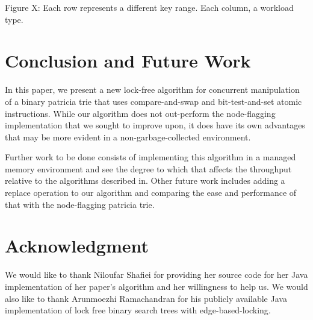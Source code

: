 \documentclass[conference]{IEEEtran}
\begin{document}
Figure X: Each row represents a different key range. Each column, a workload type.
\clearpage


\section{Conclusion and Future Work}
In this paper, we present a new lock-free algorithm for concurrent manipulation of a binary patricia trie that uses compare-and-swap and bit-test-and-set atomic instructions. While our algorithm does not out-perform the node-flagging implementation that we sought to improve upon, it does have its own advantages that may be more evident in a non-garbage-collected environment.
\par
Further work to be done consists of implementing this algorithm in a managed memory environment and see the degree to which that affects the throughput relative to the algorithms described in\cite{Shafiei2013}\cite{Natarajan2014}. Other future work includes adding a replace operation to our algorithm and comparing the ease and performance of that with the node-flagging patricia trie\cite{Shafiei2013}.


\section{Acknowledgment}
We would like to thank Niloufar Shafiei for providing her source code for her Java implementation of her paper's algorithm\cite{Shafiei2013} and her willingness to help us. We would also like to thank Arunmoezhi Ramachandran for his publicly available Java implementation of lock free binary search trees with edge-based-locking\cite{LFBST}.




\end{document}
